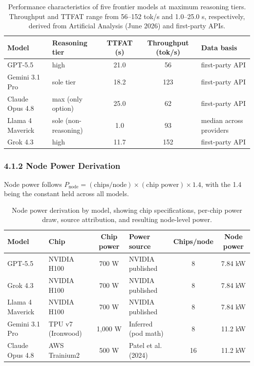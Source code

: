 \documentclass[11pt]{article}
\begin{document}
\begin{table}[htbp]
  \centering
  \begin{tabularx}{\textwidth}{@{}l l c c L@{}}
    \toprule
    \textbf{Model} & \textbf{Reasoning tier} & \textbf{TTFAT (s)} & \textbf{Throughput (tok/s)} & \textbf{Data basis} \\
    \midrule
    GPT-5.5          & high                   & 21.0 & 56  & first-party API \\
    Gemini 3.1 Pro   & sole tier              & 18.2 & 123 & first-party API \\
    Claude Opus 4.8  & max (only option)      & 25.0 & 62  & first-party API \\
    Llama 4 Maverick & sole (non-reasoning)   & 1.0  & 93  & median across providers \\
    Grok 4.3         & high                   & 11.7 & 152 & first-party API \\
    \bottomrule
  \end{tabularx}
  \caption{Performance characteristics of five frontier models at maximum reasoning tiers. Throughput and TTFAT range from 56--152 tok/s and 1.0--25.0 s, respectively, derived from Artificial Analysis (June 2026) and first-party APIs.}
  \label{tab:performance}
\end{table}

\subsubsection*{4.1.2 Node Power Derivation}

Node power follows $P_{\text{node}} = (\text{chips/node}) \times (\text{chip power}) \times 1.4$, with the 1.4 being the constant held across all models.

\begin{table}[htbp]
  \centering
  \small
  \begin{tabularx}{\textwidth}{@{}L L c L c c@{}}
    \toprule
    \textbf{Model} & \textbf{Chip} & \textbf{Chip power} & \textbf{Power source} & \textbf{Chips/node} & \textbf{Node power} \\
    \midrule
    GPT-5.5          & NVIDIA H100        & 700 W   & NVIDIA published   & 8  & 7.84 kW \\
    Grok 4.3         & NVIDIA H100        & 700 W   & NVIDIA published   & 8  & 7.84 kW \\
    Llama 4 Maverick & NVIDIA H100        & 700 W   & NVIDIA published   & 8  & 7.84 kW \\
    Gemini 3.1 Pro   & TPU v7 (Ironwood)  & 1,000 W & Inferred (pod math)& 8  & 11.2 kW \\
    Claude Opus 4.8  & AWS Trainium2      & 500 W   & Patel et al. (2024) & 16 & 11.2 kW \\
    \bottomrule
  \end{tabularx}
  \caption{Node power derivation by model, showing chip specifications, per-chip power draw, source attribution, and resulting node-level power.}
  \label{tab:nodepower}
\end{table}
\end{document}
